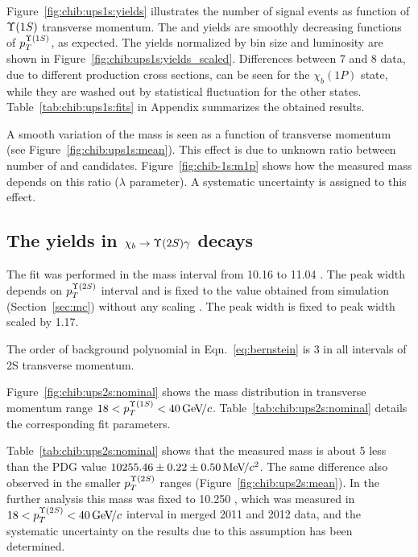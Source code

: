 Figure~\ref{fig:chib:ups1s:yields} illustrates the number of signal events as
function of $\Y1S$ transverse momentum. The \chibOneP and \chibThreeP yields
are smoothly decreasing functions of $p_T^{\Y1S}$, as expected. The yields
normalized by bin size and luminosity are shown in
Figure~\ref{fig:chib:ups1s:yields_scaled}. Differences between 7 and 8 \tev
data, due to different production cross sections, can be seen for the
$\chi_b(1P)$ state, while they are washed out by statistical fluctuation for
the other states. Table~\ref{tab:chib:ups1s:fits} in Appendix summarizes the
obtained results.



A smooth variation of the \chiboneOneP mass is seen as a function of transverse
momentum (see Figure~\ref{fig:chib:ups1s:mean}). This effect is due to unknown
ratio between number of \chiboneOneP and \chiboneTwoP candidates.
Figure~\ref{fig:chib-1s:m1p} shows how the measured mass depends on this ratio
($\lambda$ parameter). A systematic uncertainty is assigned to this effect.





\subsection{The \texorpdfstring{\chib}{chib} yields in
	\texorpdfstring{$\chib \to \Y2S \gamma$}{chib --> Y(2S) gamma} decays}
\label{sec:chib:ups2s:fit}

The fit was performed in the mass interval from 10.16 \gevcc to 11.04 \gevcc.
The  \chiboneTwoP peak width depends on $p_T^{\Y2S}$ interval and is fixed to
the value obtained from simulation (Section~\ref{sec:mc}) without any scaling .
The \chiboneThreeP peak width is fixed to \chiboneTwoP peak width scaled by
1.17.


The order of background polynomial in Eqn.~\ref{eq:bernstein} is 3 in all
intervals of \Y2S transverse momentum.


Figure~\ref{fig:chib:ups2s:nominal} shows the mass distribution in transverse
momentum range $18 < p_T^{\OneS} < 40 \gevc$. Table~\ref{tab:chib:ups2s:nominal}
details the corresponding fit parameters.




Table~\ref{tab:chib:ups2s:nominal} shows that the measured \chiboneTwoP mass is
about 5 \mevcc less than the PDG value $10255.46  \pm 0.22 \pm 0.50 {\mathrm{\,Me\kern -0.1em V\!/}c^2}$.
The same difference also observed in the smaller $p_T^{\Y2S}$ ranges
(Figure~\ref{fig:chib:ups2s:mean}).
In the further analysis this mass was fixed to 10.250 \gevcc, which was measured
in $18 < p_T^{\Y2S} < 40 \gevc$ interval in merged 2011 and 2012 data, and the
systematic uncertainty on the results due to this assumption has been
determined.

